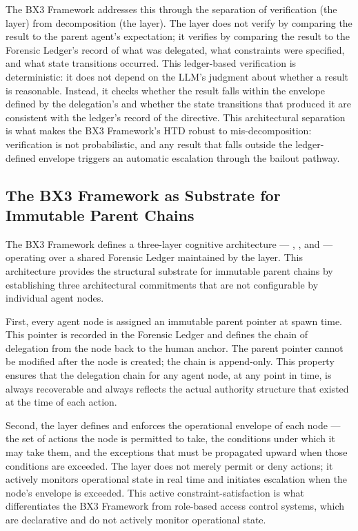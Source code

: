 The BX3 Framework addresses this through the separation of verification (the \truth{} layer) from decomposition (the \purpose{} layer). The \truth{} layer does not verify by comparing the result to the parent agent's expectation; it verifies by comparing the result to the Forensic Ledger's record of what was delegated, what constraints were specified, and what state transitions occurred. This ledger-based verification is deterministic: it does not depend on the LLM's judgment about whether a result is reasonable. Instead, it checks whether the result falls within the envelope defined by the delegation's \bounds{} and whether the state transitions that produced it are consistent with the ledger's record of the directive. This architectural separation is what makes the BX3 Framework's HTD robust to mis-decomposition: verification is not probabilistic, and any result that falls outside the ledger-defined envelope triggers an automatic escalation through the bailout pathway.

\subsection{The BX3 Framework as Substrate for Immutable Parent Chains}
\label{sec:bx3-substrate}

The BX3 Framework defines a three-layer cognitive architecture — \purpose{}, \truth{}, and \bounds{} — operating over a shared Forensic Ledger maintained by the \fact{} layer. This architecture provides the structural substrate for immutable parent chains by establishing three architectural commitments that are not configurable by individual agent nodes.

First, every agent node is assigned an immutable parent pointer at spawn time. This pointer is recorded in the Forensic Ledger and defines the chain of delegation from the node back to the human anchor. The parent pointer cannot be modified after the node is created; the chain is append-only. This property ensures that the delegation chain for any agent node, at any point in time, is always recoverable and always reflects the actual authority structure that existed at the time of each action.

Second, the \bounds{} layer defines and enforces the operational envelope of each node — the set of actions the node is permitted to take, the conditions under which it may take them, and the exceptions that must be propagated upward when those conditions are exceeded. The \bounds{} layer does not merely permit or deny actions; it actively monitors operational state in real time and initiates escalation when the node's envelope is exceeded. This active constraint-satisfaction is what differentiates the BX3 Framework from role-based access control systems, which are declarative and do not actively monitor operational state.


